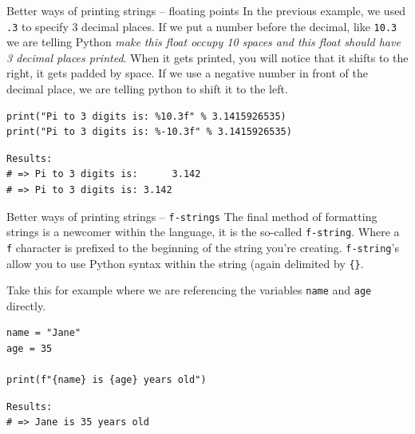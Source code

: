 \documentclass[10pt]{beamer}
\begin{document}
\begin{frame}[label={sec:orgad0c67e},fragile]{Better ways of printing strings -- floating points}
 In the previous example, we used \texttt{.3} to specify 3 decimal places. If we put a number
before the decimal, like \texttt{10.3} we are telling Python \emph{make this float occupy 10 spaces
and this float should have 3 decimal places printed}.  When it gets printed, you will
notice that it shifts to the right, it gets padded by space. If we use a negative
number in front of the decimal place, we are telling python to shift it to the left.

\begin{verbatim}
print("Pi to 3 digits is: %10.3f" % 3.1415926535)
print("Pi to 3 digits is: %-10.3f" % 3.1415926535)
\end{verbatim}

\begin{verbatim}
Results: 
# => Pi to 3 digits is:      3.142
# => Pi to 3 digits is: 3.142
\end{verbatim}
\end{frame}

\begin{frame}[label={sec:orga1f96c0},fragile]{Better ways of printing strings -- \texttt{f-strings}}
 The final method of formatting strings is a newcomer within the language, it is the
so-called \texttt{f-string}. Where a \texttt{f} character is prefixed to the beginning of the string
you're creating. \texttt{f-string}'s allow you to use Python syntax within the string (again
delimited by \texttt{\{\}}.

Take this for example where we are referencing the variables \texttt{name} and \texttt{age} directly.

\begin{verbatim}
name = "Jane"
age = 35

print(f"{name} is {age} years old")
\end{verbatim}

\begin{verbatim}
Results: 
# => Jane is 35 years old
\end{verbatim}
\end{frame}
\end{document}
